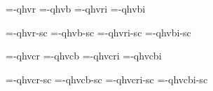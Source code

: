 

\ifx\sizespec\undefined \def\sizespec{}\fi
\ifx\font\corkencoded {}\else {}\fi

\ifx\font\unicoded  
   \def\famname{texgyreheroscn} 
   \let\tenrmn=\tenrm \let\tenbfn=\tenbf \let\tenitn=\tenit \let\tenbin=\tenbi
   \let\tenrmnc=\tenrmc \let\tenbfnc=\tenbfc \let\tenitnc=\tenitc \let\tenbinc=\tenbic
   \def\famname{texgyreheros} 
\else

\font\tenrm=\tmp-qhvr  \sizespec
\font\tenbf=\tmp-qhvb  \sizespec
\font\tenit=\tmp-qhvri \sizespec
\font\tenbi=\tmp-qhvbi \sizespec

\font\tenrmc=\tmp-qhvr-sc  \sizespec
\font\tenbfc=\tmp-qhvb-sc  \sizespec
\font\tenitc=\tmp-qhvri-sc \sizespec
\font\tenbic=\tmp-qhvbi-sc \sizespec

\fi

\tenrm

\font\tenrmn=\tmp-qhvcr  \sizespec
\font\tenbfn=\tmp-qhvcb  \sizespec
\font\tenitn=\tmp-qhvcri \sizespec
\font\tenbin=\tmp-qhvcbi \sizespec

\font\tenrmnc=\tmp-qhvcr-sc  \sizespec
\font\tenbfnc=\tmp-qhvcb-sc  \sizespec
\font\tenitnc=\tmp-qhvcri-sc \sizespec
\font\tenbinc=\tmp-qhvcbi-sc \sizespec

\def\caps#1{{\escapechar=-1 \expandafter}%
  \expandafter\csname\expandafter\tenonlytext\string#1c\endcsname}
\def\tenonlytext{ten}

\def\narrow{%
  \let\tenrm=\tenrmn \let\tenbf=\tenbfn
  \let\tenit=\tenitn \let\tenbi=\tenbin 
  \let\tenrmc=\tenrmnc \let\tenbfc=\tenbfnc
  \let\tenitc=\tenitnc \let\tenbic=\tenbinc \tenrm}

\ifx\font\corkencoded \else  \fi

\ifx\normalTXmath\undefined  \else\normalTXmath \fi


